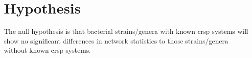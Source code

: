 \section{\huge Hypothesis}
The null hypothesis is that bacterial strains/genera with known \ac{crsp} systems will show no significant differences in network statistics to those strains/genera without known \ac{crsp} systems.

